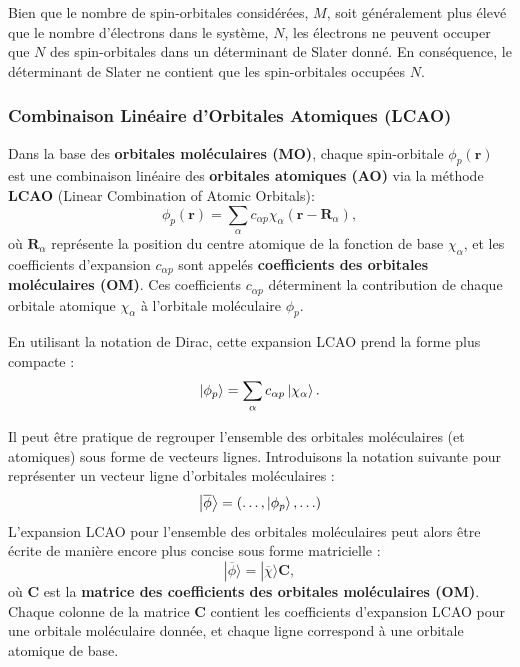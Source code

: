 \documentclass[12pt,a4paper]{article} %
\numberwithin{equation}{section} %
\numberwithin{figure}{section} %
\numberwithin{table}{section} %
\begin{document}
Bien que le nombre de spin-orbitales considérées, $M$, soit généralement plus élevé que le nombre d'électrons dans le système, $N$, les électrons ne peuvent occuper que $N$ des spin-orbitales dans un déterminant de Slater donné. En conséquence, le déterminant de Slater ne contient que les spin-orbitales occupées $N$.


\subsubsection{Combinaison Linéaire d'Orbitales Atomiques (LCAO)}

Dans la base des \textbf{orbitales moléculaires (MO)}, chaque spin-orbitale $\phi_p(\mathbf{r})$ est une combinaison linéaire des \textbf{orbitales atomiques (AO)} via la méthode \textbf{LCAO} (Linear Combination of Atomic Orbitals):
\begin{equation}
\phi_p(\mathbf{r}) = \sum_\alpha c_{\alpha p} \chi_\alpha(\mathbf{r} - \mathbf{R}_\alpha),
\end{equation}
où $\mathbf{R}_\alpha$ représente la position du centre atomique de la fonction de base $\chi_\alpha$, et les coefficients d'expansion $c_{\alpha p}$ sont appelés \textbf{coefficients des orbitales moléculaires (OM)}. Ces coefficients $c_{\alpha p}$ déterminent la contribution de chaque orbitale atomique $\chi_\alpha$ à l'orbitale moléculaire $\phi_p$.

En utilisant la notation de Dirac, cette expansion LCAO prend la forme plus compacte :
\begin{equation}
  \ket{\phi_p} = \sum_\alpha c_{\alpha p}\ket{\chi_\alpha}.
\end{equation}

Il peut être pratique de regrouper l'ensemble des orbitales moléculaires (et atomiques) sous forme de vecteurs lignes.  Introduisons la notation suivante pour représenter un vecteur ligne d'orbitales moléculaires :
\begin{equation}
    \ket{\overline{\phi}} = (\ldots, \ket{\phi_p}, \ldots)
\end{equation}
L'expansion LCAO pour l'ensemble des orbitales moléculaires peut alors être écrite de manière encore plus concise sous forme matricielle :
\begin{equation}
    | \overline{\phi} \rangle = | \overline{\chi} \rangle \mathbf{C},
\end{equation}
où $\mathbf{C}$ est la \textbf{matrice des coefficients des orbitales moléculaires (OM)}. Chaque colonne de la matrice $\mathbf{C}$ contient les coefficients d'expansion LCAO pour une orbitale moléculaire donnée, et chaque ligne correspond à une orbitale atomique de base.
\end{document}
